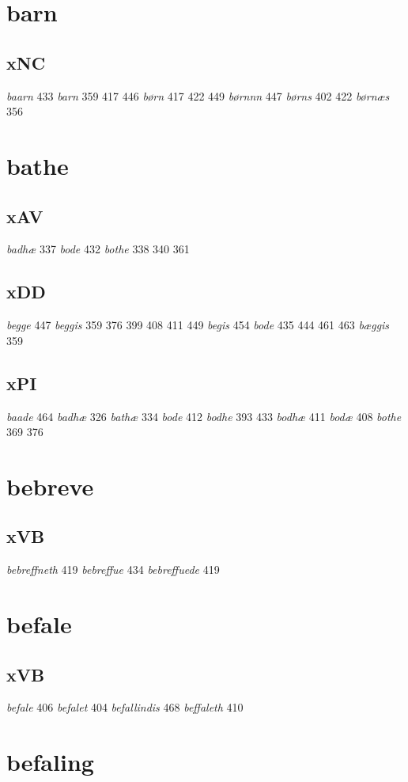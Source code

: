 \documentclass[a4paper,twocolumn]{article}
\begin{document}
\section{barn}
\label{sec:org1eb1373}
\subsection{xNC}
\label{sec:orgf462f21}
\emph{baarn} 433 \emph{barn} 359 417 446 \emph{børn} 417 422 449 \emph{børnnn} 447 \emph{børns} 402 422 \emph{børnæs} 356 
\section{bathe}
\label{sec:orgb5e1ba3}
\subsection{xAV}
\label{sec:orgb196883}
\emph{badhæ} 337 \emph{bode} 432 \emph{bothe} 338 340 361 
\subsection{xDD}
\label{sec:org24eb307}
\emph{begge} 447 \emph{beggis} 359 376 399 408 411 449 \emph{begis} 454 \emph{bode} 435 444 461 463 \emph{bæggis} 359 
\subsection{xPI}
\label{sec:orgccb4727}
\emph{baade} 464 \emph{badhæ} 326 \emph{bathæ} 334 \emph{bode} 412 \emph{bodhe} 393 433 \emph{bodhæ} 411 \emph{bodæ} 408 \emph{bothe} 369 376 
\section{bebreve}
\label{sec:org809f0c7}
\subsection{xVB}
\label{sec:orga101372}
\emph{bebreffneth} 419 \emph{bebreffue} 434 \emph{bebreffuede} 419 
\section{befale}
\label{sec:org1502895}
\subsection{xVB}
\label{sec:org8579cdd}
\emph{befale} 406 \emph{befalet} 404 \emph{befallindis} 468 \emph{beffaleth} 410 
\section{befaling}
\label{sec:orgb51e3fd}
\end{document}

